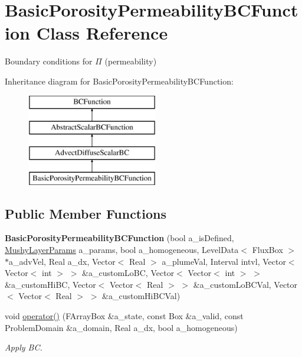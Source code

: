 \hypertarget{class_basic_porosity_permeability_b_c_function}{\section{Basic\-Porosity\-Permeability\-B\-C\-Function Class Reference}
\label{class_basic_porosity_permeability_b_c_function}
}


Boundary conditions for $\Pi$ (permeability)  


Inheritance diagram for Basic\-Porosity\-Permeability\-B\-C\-Function\-:\begin{figure}[H]
\begin{center}
\leavevmode
\includegraphics[height=4.000000cm]{class_basic_porosity_permeability_b_c_function}
\end{center}
\end{figure}
\subsection*{Public Member Functions}
\begin{DoxyCompactItemize}
\item 
\hypertarget{class_basic_porosity_permeability_b_c_function_a0b9bf045ea7a47fee8064ca8a0437eee}{{\bfseries Basic\-Porosity\-Permeability\-B\-C\-Function} (bool a\-\_\-is\-Defined, \hyperlink{class_mushy_layer_params}{Mushy\-Layer\-Params} a\-\_\-params, bool a\-\_\-homogeneous, Level\-Data$<$ Flux\-Box $>$ $\ast$a\-\_\-adv\-Vel, Real a\-\_\-dx, Vector$<$ Real $>$ a\-\_\-plume\-Val, Interval intvl, Vector$<$ Vector$<$ int $>$ $>$ \&a\-\_\-custom\-Lo\-B\-C, Vector$<$ Vector$<$ int $>$ $>$ \&a\-\_\-custom\-Hi\-B\-C, Vector$<$ Vector$<$ Real $>$ $>$ \&a\-\_\-custom\-Lo\-B\-C\-Val, Vector$<$ Vector$<$ Real $>$ $>$ \&a\-\_\-custom\-Hi\-B\-C\-Val)}\label{class_basic_porosity_permeability_b_c_function_a0b9bf045ea7a47fee8064ca8a0437eee}

\item 
void \hyperlink{class_basic_porosity_permeability_b_c_function_a436d10317f86cbf27980f1b3a694386a}{operator()} (F\-Array\-Box \&a\-\_\-state, const Box \&a\-\_\-valid, const Problem\-Domain \&a\-\_\-domain, Real a\-\_\-dx, bool a\-\_\-homogeneous)
\begin{DoxyCompactList}\small\item\em Apply B\-C. \end{DoxyCompactList}\end{DoxyCompactItemize}
